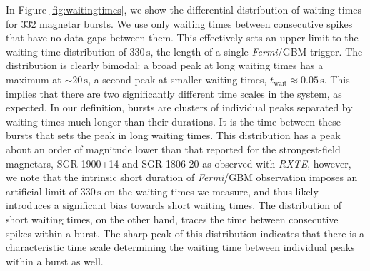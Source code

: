 \documentclass[12pt]{emulateapj}
\newcommand{\project}[1]{\textsl{#1}}
\newcommand{\fermi}{\project{Fermi}}
\newcommand{\rxte}{\project{RXTE}}
\begin{document}
In Figure \ref{fig:waitingtimes}, we show the differential distribution of waiting times for $332$ magnetar bursts. We use only waiting times 
between consecutive spikes that have no data gaps between them. This effectively sets an upper limit to the waiting time distribution of $330\,\mathrm{s}$,
the length of a single \fermi/GBM trigger. The distribution is clearly bimodal: a broad peak at long waiting times has a maximum at $\sim 20 \,\mathrm{s}$, a
second peak at smaller waiting times, $t_\mathrm{wait} \approx 0.05 \,\mathrm{s}$. This implies that there are two significantly different time scales
in the system, as expected. In our definition, bursts are clusters of individual peaks separated by
waiting times much longer than their durations. It is the time between these bursts that sets the peak in long waiting times. This distribution has a peak about
an order of magnitude lower than that reported for the strongest-field magnetars, SGR 1900+14 \citep{gogus1999} and SGR 1806-20 \citep{gogus2000} as observed
with \rxte, however, we note that the intrinsic short duration of \fermi/GBM observation imposes an artificial limit of $330\,\mathrm{s}$ on the waiting times we measure,
and thus likely introduces a significant bias towards short waiting times. 
The distribution of short waiting times, on the other hand, traces the time between consecutive spikes within a burst. The sharp peak of this distribution indicates
that there is a characteristic time scale determining the waiting time between individual peaks within a burst as well. 
\end{document}
